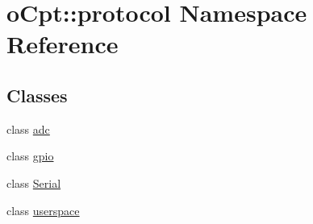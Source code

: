 \hypertarget{namespaceo_cpt_1_1protocol}{}\section{o\+Cpt\+:\+:protocol Namespace Reference}
\label{namespaceo_cpt_1_1protocol}
\subsection*{Classes}
\begin{DoxyCompactItemize}
\item 
class \hyperlink{classo_cpt_1_1protocol_1_1adc}{adc}
\item 
class \hyperlink{classo_cpt_1_1protocol_1_1gpio}{gpio}
\item 
class \hyperlink{classo_cpt_1_1protocol_1_1_serial}{Serial}
\item 
class \hyperlink{classo_cpt_1_1protocol_1_1userspace}{userspace}
\end{DoxyCompactItemize}
